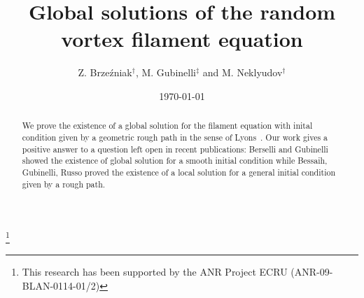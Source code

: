 \documentclass[11pt,a4paper,reqno]{amsart}%
\theoremstyle{plain}
\theoremstyle{remark}
\theoremstyle{plain}
\numberwithin{equation}{section}
\begin{document}
\title{Global solutions of the random vortex filament equation}

\author{Z. Brze\'{z}niak$^\dag$, M. Gubinelli$^\ddag$ and
M. Neklyudov$^\dag$}

\address{
$^\dag$Department of Mathematics, University of York, Heslington,
UK
\\
$^\ddag$CEREMADE \& CNRS UMR 7534, Universit\'e Paris-Dauphine,  France
}

\thanks{This research has been supported by the ANR Project ECRU (ANR-09-BLAN-0114-01/2)}



\date{\today}

\begin{abstract}
We prove the existence of a global solution for the 
 filament equation with inital condition given by a geometric rough path in the sense of Lyons~\cite{[Lyons-1998]}. Our work gives a positive answer to a question left open in recent publications: Berselli and  Gubinelli \cite{[Bers+Gub_2007]}  showed the existence of global solution for a smooth  initial condition  while  Bessaih, Gubinelli, Russo \cite{[Bess+Gub_2005]} proved the existence of a local solution for a general  initial condition given by a rough path.
\end{abstract}


\maketitle
\end{document}

